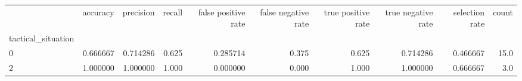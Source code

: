 \begin{tabular}{lrrrrrrrrr}
\toprule
{} &  accuracy &  precision &  recall &  false positive rate &  false negative rate &  true positive rate &  true negative rate &  selection rate &  count \\
tactical\_situation &           &            &         &                      &                      &                     &                     &                 &        \\
\midrule
0                  &  0.666667 &   0.714286 &   0.625 &             0.285714 &                0.375 &               0.625 &            0.714286 &        0.466667 &   15.0 \\
2                  &  1.000000 &   1.000000 &   1.000 &             0.000000 &                0.000 &               1.000 &            1.000000 &        0.666667 &    3.0 \\
\bottomrule
\end{tabular}

